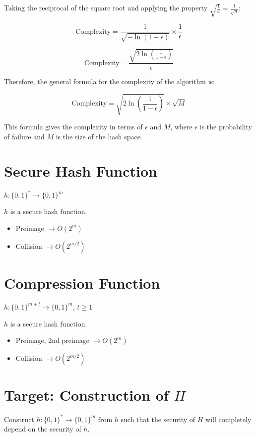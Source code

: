 \documentclass[11pt]{article}
\begin{document}
Taking the reciprocal of the square root and applying the property \( \sqrt{\frac{1}{a}} = \frac{1}{\sqrt{a}} \):

\[ \text{Complexity} = \frac{1}{\sqrt{-\ln(1 - \epsilon)}} \times \frac{1}{\epsilon} \]

\[ \text{Complexity} = \frac{\sqrt{2\ln\left(\frac{1}{1 - \epsilon}\right)}}{\epsilon} \]

Therefore, the general formula for the complexity of the algorithm is:

\[ \text{Complexity} = \sqrt{2\ln\left(\frac{1}{1 - \epsilon}\right)} \times \sqrt{M} \]

This formula gives the complexity in terms of \( \epsilon \) and \( M \), where \( \epsilon \) is the probability of failure and \( M \) is the size of the hash space.
\section{Secure Hash Function}

$h: \{0,1\}^* \rightarrow \{0, 1\}^m$

$h$ is a secure hash function.

\begin{itemize}
    \item Preimage $\rightarrow O(2^m)$
    \item Collision $\rightarrow O(2^{m/2})$
\end{itemize}

\section{Compression Function}

$h: \{0,1\}^{m+t} \rightarrow \{0, 1\}^m$, $t \geq 1$

$h$ is a secure hash function.

\begin{itemize}
    \item Preimage, 2nd preimage $\rightarrow O(2^m)$
    \item Collision $\rightarrow O(2^{m/2})$
\end{itemize}

\section{Target: Construction of $H$}

Construct $h : \{0, 1\}^* \rightarrow \{0, 1\}^m$ from $h$ such that the security of $H$ will completely depend on the security of $h$.
\end{document}
